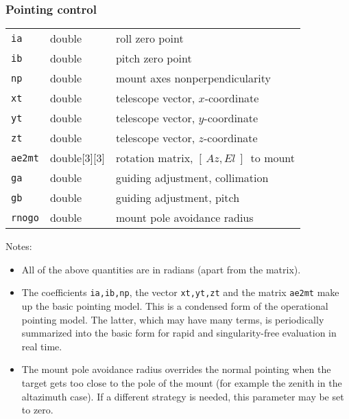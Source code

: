 \documentclass[12pt,fleqn,twoside]{article}
\renewcommand{\_}{{\tt\char'137}}     %
\newcommand{\azel}      {$[\,Az,El~]$}
\newcommand{\notelist}  {\goodbreak \vspace{1ex} Notes:
                        \vspace{-3ex}}
\begin{document}
\subsubsection{Pointing control}
\begin{tabular}{lll}
{\tt ia}    & {double} &       roll zero point \\
{\tt ib}    & {double} &       pitch zero point \\
{\tt np}    & {double} &       mount axes nonperpendicularity \\
{\tt xt}    & {double} &       telescope vector, $x$-coordinate \\
{\tt yt}    & {double} &       telescope vector, $y$-coordinate \\
{\tt zt}    & {double} &       telescope vector, $z$-coordinate \\
{\tt ae2mt} & {double[3][3]} & rotation matrix, \azel\ to mount \\
{\tt ga}    & {double} &       guiding adjustment, collimation \\
{\tt gb}    & {double} &       guiding adjustment, pitch \\
{\tt rnogo} & {double} &       mount pole avoidance radius \\
\end{tabular}

\notelist
\begin{itemize}
\item All of the above quantities are in radians (apart from the matrix).
\item The coefficients {\tt ia,ib,np}, the vector
      {\tt xt,yt,zt} and the matrix {\tt ae2mt} make up
      the basic pointing model. This is a condensed form of the operational
      pointing model.  The latter, which may have many terms, is
      periodically summarized into the basic form for rapid and
      singularity-free evaluation in real time.
\item The mount pole avoidance radius overrides the normal
      pointing
      when the target gets too close to the pole of the mount (for
      example the zenith in the altazimuth case).  If a different
      strategy is needed, this parameter may be set to zero.
\end{itemize}
\end{document}
